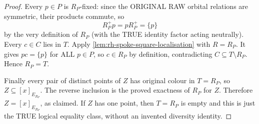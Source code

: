 \begin{proof}
Every $p\in P$ is
$R_P$-fixed: since the
ORIGINAL RAW orbital
relations are symmetric,
their products commute, so
\[
       R_P^+p=pR_P^+=\{p\}
\]
by the very definition of
$R_P$ (with the TRUE identity
factor acting neutrally).
Every $c\in C$ lies in $T$.
Apply
\cref{lem:rh-spoke-square-localisation}
with $R=R_P$. It gives
$pc=\{p\}$ for ALL $p\in P$,
so $c\in R_P$ by definition,
contradicting
$C\subseteq T\setminus R_P$.
Hence $R_P=T$.

Finally every pair of
distinct points of $Z$
has original colour in
$T=R_P$, so
$Z\subseteq[x]_{E_{R_P}}$.
The reverse inclusion is
the proved exactness of
$R_P$ for $Z$. Therefore
$Z=[x]_{E_{R_P}}$, as
claimed. If $Z$ has one
point, then $T=R_P$ is
empty and this is just
the TRUE logical equality
class, without an invented
diversity identity.
\end{proof}

